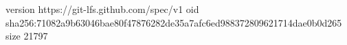 version https://git-lfs.github.com/spec/v1
oid sha256:71082a9b63046bae80f47876282de35a7afc6ed988372809621714dae0b0d265
size 21797
